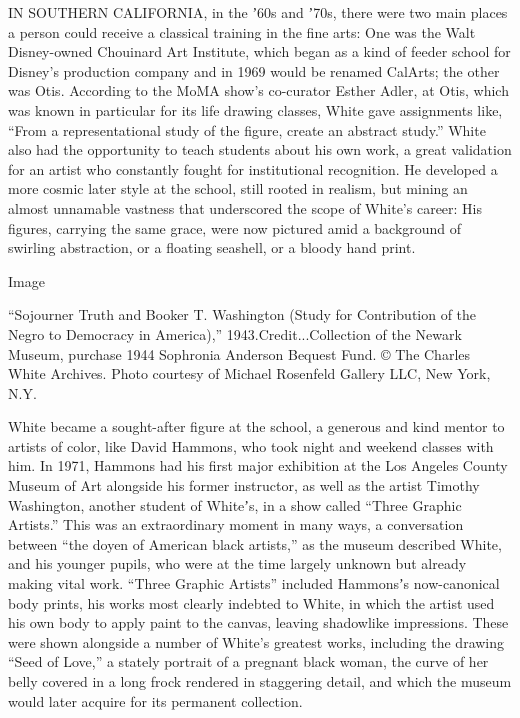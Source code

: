 IN SOUTHERN CALIFORNIA, in the ʼ60s and ʼ70s, there were two main places
a person could receive a classical training in the fine arts: One was
the Walt Disney-owned Chouinard Art Institute, which began as a kind of
feeder school for Disney's production company and in 1969 would be
renamed CalArts; the other was Otis. According to the MoMA show's
co-curator Esther Adler, at Otis, which was known in particular for its
life drawing classes, White gave assignments like, ``From a
representational study of the figure, create an abstract study.'' White
also had the opportunity to teach students about his own work, a great
validation for an artist who constantly fought for institutional
recognition. He developed a more cosmic later style at the school, still
rooted in realism, but mining an almost unnamable vastness that
underscored the scope of White's career: His figures, carrying the same
grace, were now pictured amid a background of swirling abstraction, or a
floating seashell, or a bloody hand print.

Image

``Sojourner Truth and Booker T. Washington (Study for Contribution of
the Negro to Democracy in America),'' 1943.Credit...Collection of the
Newark Museum, purchase 1944 Sophronia Anderson Bequest Fund. © The
Charles White Archives. Photo courtesy of Michael Rosenfeld Gallery LLC,
New York, N.Y.

White became a sought-after figure at the school, a generous and kind
mentor to artists of color, like David Hammons, who took night and
weekend classes with him. In 1971, Hammons had his first major
exhibition at the Los Angeles County Museum of Art alongside his former
instructor, as well as the artist Timothy Washington, another student of
Whiteʼs, in a show called ``Three Graphic Artists.'' This was an
extraordinary moment in many ways, a conversation between ``the doyen of
American black artists,'' as the museum described White, and his younger
pupils, who were at the time largely unknown but already making vital
work. ``Three Graphic Artists'' included Hammonsʼs now-canonical body
prints, his works most clearly indebted to White, in which the artist
used his own body to apply paint to the canvas, leaving shadowlike
impressions. These were shown alongside a number of White's greatest
works, including the drawing ``Seed of Love,'' a stately portrait of a
pregnant black woman, the curve of her belly covered in a long frock
rendered in staggering detail, and which the museum would later acquire
for its permanent collection.


